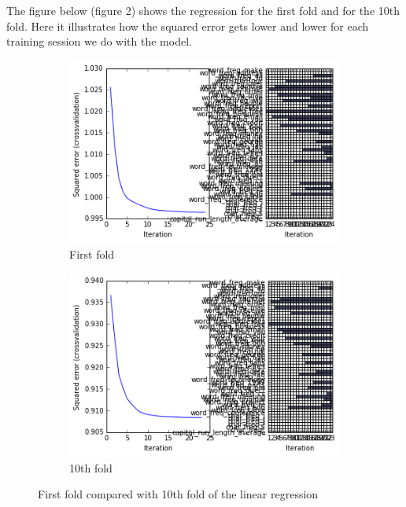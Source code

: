 The figure below (figure 2) shows the regression for the first fold and for the 10th fold. Here it illustrates how the squared error gets lower and lower for each training session we do with the model. 

\vspace{-5pt}
\begin{figure}[!ht]
\centering

\begin{subfigure}[b]{.45\linewidth}
\includegraphics[width=\linewidth]{Fig/regression_first_fold.png}
\caption{First fold}
\end{subfigure}
\begin{subfigure}[b]{.45\linewidth}
\includegraphics[width=\linewidth]{Fig/regression_10th_fold.png}
\caption{10th fold}
\end{subfigure}

\label{fig:first_vs_10th}
\caption{First fold compared with 10th fold of the linear regression}
\end{figure}
  